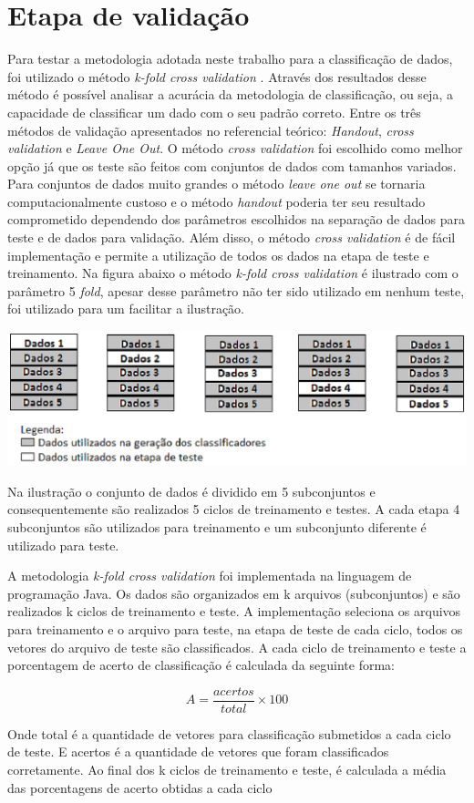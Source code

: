 \section{Etapa de validação}
Para testar a metodologia adotada neste trabalho para a classificação de dados, foi utilizado o método \textit{k-fold cross validation} \cite{Kohavi95Cross} \cite{Baldisserotto05Validacao}. Através dos resultados desse método é possível analisar a acurácia da metodologia de classificação, ou seja, a capacidade de classificar um dado com o seu padrão correto.
Entre os três métodos de validação apresentados no referencial teórico: \textit{Handout}, \textit{cross validation} e \textit{Leave One Out}. O método \textit{cross validation} foi escolhido como melhor opção já que os teste são feitos com conjuntos de dados com tamanhos variados. Para conjuntos de dados muito grandes o método \textit{leave one out} se tornaria computacionalmente custoso e o método \textit{handout} poderia ter seu resultado comprometido dependendo dos parâmetros escolhidos na separação de dados para teste e de dados para validação. Além disso, o método \textit{cross validation} é de fácil implementação e permite a utilização de todos os dados na etapa de teste e treinamento.
Na figura abaixo o método \textit{k-fold cross validation} é ilustrado com o parâmetro 5 \textit{fold}, apesar desse parâmetro não ter sido utilizado em nenhum teste, foi utilizado para um facilitar a ilustração. 
\begin{center}
	\includegraphics[scale=1.0]{graficos/cross_validation}
	\label{img:cross_validation}
\end{center}

Na ilustração o conjunto de dados é dividido em 5 subconjuntos e consequentemente são realizados 5 ciclos de treinamento e testes. A cada etapa 4 subconjuntos são utilizados para treinamento e um subconjunto diferente é utilizado para teste. 

A metodologia \textit{k-fold cross validation} foi implementada na linguagem de programação Java. Os dados são organizados em k arquivos (subconjuntos) e são realizados k ciclos de treinamento e teste. A implementação seleciona os arquivos para treinamento e o arquivo para teste, na etapa de teste de cada ciclo, todos os vetores do arquivo de teste são classificados. A cada ciclo de treinamento e teste a porcentagem de acerto de classificação é calculada da seguinte forma:

$$A = \frac{acertos}{total}\times 100$$

Onde total é a quantidade de vetores para classificação submetidos a cada ciclo de teste. E acertos é a quantidade de vetores que foram classificados corretamente.
Ao final dos k ciclos de treinamento e teste, é calculada a média das porcentagens de acerto obtidas a cada ciclo
